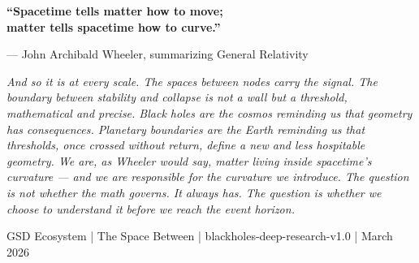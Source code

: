 \documentclass[11pt,letterpaper]{article}
\begin{document}
\vspace{2em}
\begin{quotebox}
\begin{center}
{\large\sffamily\textcolor{primary}{\textbf{``Spacetime tells matter how to move;\\matter tells spacetime how to curve.''}}}

\vspace{0.5em}
{\small\sffamily\textcolor{subtlegray}{--- John Archibald Wheeler, summarizing General Relativity}}
\end{center}

\vspace{1em}
\textit{And so it is at every scale. The spaces between nodes carry the signal. The boundary between stability and collapse is not a wall but a threshold, mathematical and precise. Black holes are the cosmos reminding us that geometry has consequences. Planetary boundaries are the Earth reminding us that thresholds, once crossed without return, define a new and less hospitable geometry. We are, as Wheeler would say, matter living inside spacetime's curvature --- and we are responsible for the curvature we introduce. The question is not whether the math governs. It always has. The question is whether we choose to understand it before we reach the event horizon.}

\vspace{0.5em}
{\small\sffamily\textcolor{subtlegray}{GSD Ecosystem | The Space Between | blackholes-deep-research-v1.0 | March 2026}}
\end{quotebox}
\end{document}
